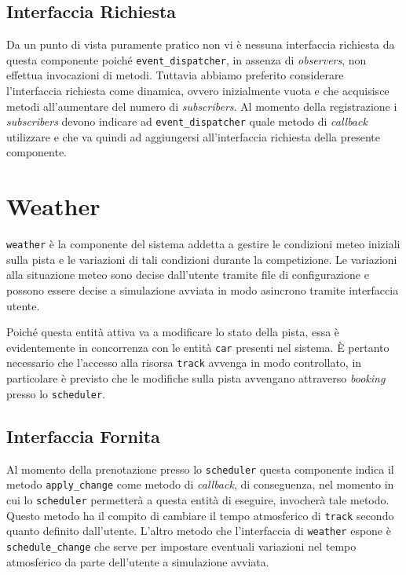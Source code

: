\documentclass[11pt,a4paper]{report}
\newcommand{\fun}[1]{\texttt{#1}}
\begin{document}
\subsection*{Interfaccia Richiesta}
Da un punto di vista puramente pratico non vi è nessuna interfaccia richiesta da questa componente poiché \texttt{event\_dispatcher}, in assenza di \textit{observers}, non effettua invocazioni di metodi. Tuttavia abbiamo preferito considerare l'interfaccia richiesta come dinamica, ovvero inizialmente vuota e che acquisisce metodi all'aumentare del numero di \textit{subscribers}. Al momento della registrazione i \textit{subscribers} devono indicare ad \texttt{event\_dispatcher} quale metodo di \textit{callback} utilizzare e che va quindi ad aggiungersi all'interfaccia richiesta della presente componente.

\section{Weather}
\texttt{weather} è la componente del sistema addetta a gestire le condizioni meteo iniziali sulla pista e le variazioni di tali condizioni durante la competizione. Le variazioni alla situazione meteo sono decise dall'utente tramite file di configurazione e possono essere decise a simulazione avviata in modo asincrono tramite interfaccia utente.

Poiché questa entità attiva va a modificare lo stato della pista, essa è evidentemente in concorrenza con le entità \texttt{car} presenti nel sistema. \`E pertanto necessario che l'accesso alla risorsa \texttt{track} avvenga in modo controllato, in particolare è previsto che le modifiche sulla pista avvengano attraverso \textit{booking} presso lo \texttt{scheduler}.

\subsection*{Interfaccia Fornita}
Al momento della prenotazione presso lo \texttt{scheduler} questa componente indica il metodo \fun{apply\_change} come metodo di \textit{callback}, di conseguenza, nel momento in cui lo \texttt{scheduler} permetterà a questa entità di eseguire, invocherà tale metodo. Questo metodo ha il compito di cambiare il tempo atmosferico di \texttt{track} secondo quanto definito dall'utente.
L'altro metodo che l'interfaccia di \texttt{weather} espone è \fun{schedule\_change} che serve per impostare eventuali variazioni nel tempo atmosferico da parte dell'utente a simulazione avviata.
\end{document}
